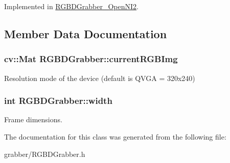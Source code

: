 Implemented in \hyperlink{classRGBDGrabber__OpenNI2_af986000241075e4e7cc0343b391d2eb6}{R\-G\-B\-D\-Grabber\-\_\-\-Open\-N\-I2}.



\subsection{Member Data Documentation}
\hypertarget{classRGBDGrabber_a077f46c80736207093874e307e53b269}{
\subsubsection[{current\-R\-G\-B\-Img}]{\setlength{\rightskip}{0pt plus 5cm}cv\-::\-Mat R\-G\-B\-D\-Grabber\-::current\-R\-G\-B\-Img\hspace{0.3cm}{\ttfamily [protected]}}}\label{classRGBDGrabber_a077f46c80736207093874e307e53b269}
Resolution mode of the device (default is Q\-V\-G\-A = 320x240) \hypertarget{classRGBDGrabber_aafd74a114077376b2326476e1b65ce20}{
\subsubsection[{width}]{\setlength{\rightskip}{0pt plus 5cm}int R\-G\-B\-D\-Grabber\-::width\hspace{0.3cm}{\ttfamily [protected]}}}\label{classRGBDGrabber_aafd74a114077376b2326476e1b65ce20}
Frame dimensions. 

The documentation for this class was generated from the following file\-:\begin{DoxyCompactItemize}
\item 
grabber/R\-G\-B\-D\-Grabber.\-h\end{DoxyCompactItemize}
